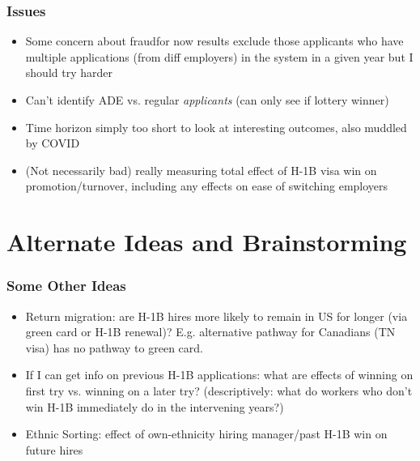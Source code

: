 \documentclass[xcolor=dvipsnames, compress, 12pt, aspectratio=169, handout]{beamer}
\begin{document}
\begin{frame}
    \frametitle{Issues}
    \begin{itemize}
        \item Some concern about fraud\textemdash for now results exclude those applicants who have multiple applications (from diff employers) in the system in a given year but I should try harder
        \item Can't identify ADE vs. regular \textit{applicants} (can only see if lottery winner)
        \item Time horizon simply too short to look at interesting outcomes, also muddled by COVID 
        \item (Not necessarily bad) really measuring total effect of H-1B visa win on promotion/turnover, including any effects on ease of switching employers
    \end{itemize}
\end{frame}

\section{Alternate Ideas and Brainstorming}

\begin{frame}
    \frametitle{Some Other Ideas}
    \begin{itemize}
        \item Return migration: are H-1B hires more likely to remain in US for longer (via green card or H-1B renewal)? E.g. alternative pathway for Canadians (TN visa) has no pathway to green card.
        \item If I can get info on previous H-1B applications: what are effects of winning on first try vs. winning on a later try? (descriptively: what do workers who don't win H-1B immediately do in the intervening years?)
        \item Ethnic Sorting: effect of own-ethnicity hiring manager/past H-1B win on future hires
    \end{itemize}
\end{frame}
\end{document}
